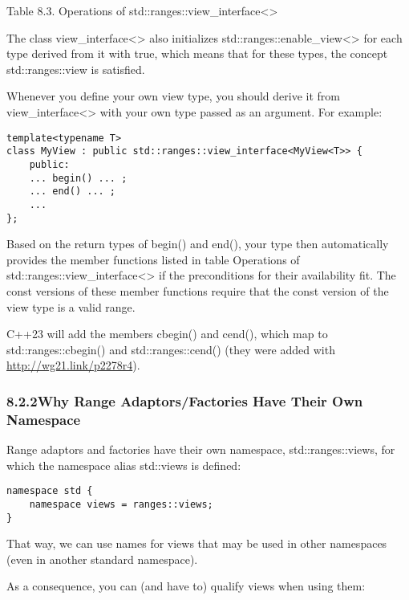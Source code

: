 \begin{center}
Table 8.3. Operations of std::ranges::view\_interface<>
\end{center}

The class view\_interface<> also initializes std::ranges::enable\_view<> for each type derived from it with true, which means that for these types, the concept std::ranges::view is satisfied.

Whenever you define your own view type, you should derive it from view\_interface<> with your own type passed as an argument. For example:

\begin{lstlisting}[style=styleCXX]
template<typename T>
class MyView : public std::ranges::view_interface<MyView<T>> {
	public:
	... begin() ... ;
	... end() ... ;
	...
};
\end{lstlisting}

Based on the return types of begin() and end(), your type then automatically provides the member functions listed in table Operations of std::ranges::view\_interface<> if the preconditions for their availability fit. The const versions of these member functions require that the const version of the view type is a valid range.

C++23 will add the members cbegin() and cend(), which map to std::ranges::cbegin() and std::ranges::cend() (they were added with \url{http://wg21.link/p2278r4}).

\subsubsection*{ 8.2.2\hspace{0.2cm}Why Range Adaptors/Factories Have Their Own Namespace}

Range adaptors and factories have their own namespace, std::ranges::views, for which the namespace alias std::views is defined:

\begin{lstlisting}[style=styleCXX]
namespace std {
	namespace views = ranges::views;
}
\end{lstlisting}

That way, we can use names for views that may be used in other namespaces (even in another standard namespace).

As a consequence, you can (and have to) qualify views when using them:

